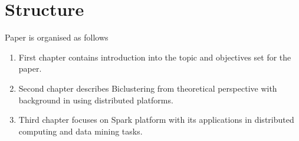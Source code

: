 \section{Structure}
Paper is organised as follows
\begin{enumerate}
\item First chapter contains introduction into the topic and objectives set for the paper.
\item Second chapter describes Biclustering from theoretical perspective with background in using distributed platforms.
\item Third chapter focuses on Spark platform with its applications in distributed computing and data mining tasks.
\end{enumerate}
